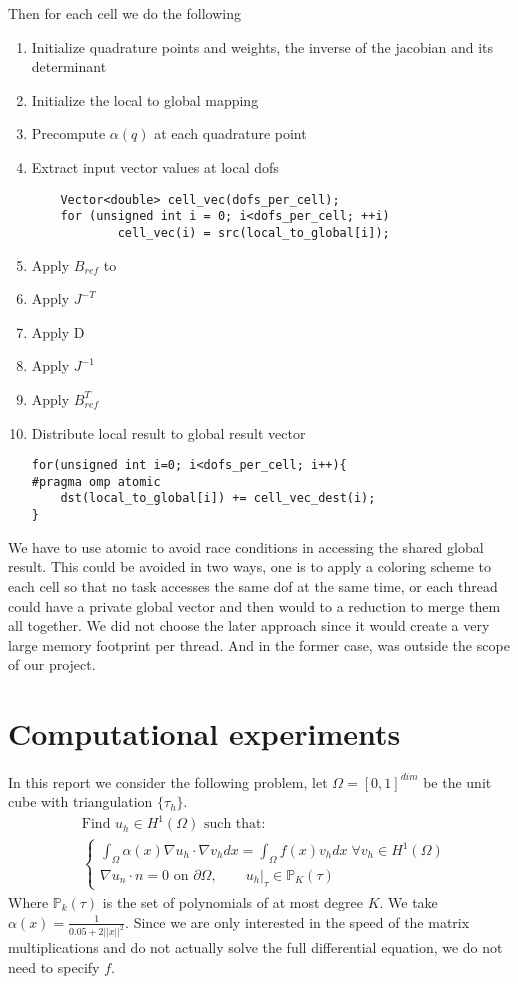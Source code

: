 \documentclass[12pt]{article}
\begin{document}
Then for each cell we do the following
\begin{enumerate}
\item Initialize quadrature points and weights, the inverse of the jacobian and its determinant
\item Initialize the local to global mapping
\item Precompute $\alpha(q)$ at each quadrature point
\item Extract input vector values at local dofs
\begin{lstlisting}
	Vector<double> cell_vec(dofs_per_cell);
	for (unsigned int i = 0; i<dofs_per_cell; ++i)
			cell_vec(i) = src(local_to_global[i]);
\end{lstlisting}
\item Apply $B_{ref}$ to 
\item Apply $J^{-T}$
\item Apply D
\item Apply $J^{-1}$
\item Apply $B^{T}_{ref}$
\item Distribute local result to global result vector
\begin{lstlisting}
for(unsigned int i=0; i<dofs_per_cell; i++){
#pragma omp atomic
	dst(local_to_global[i]) += cell_vec_dest(i);
}
\end{lstlisting}
\end{enumerate}
We have to use atomic to avoid race conditions in accessing the shared global result. This could be avoided in two ways, one is to apply a coloring scheme to each cell so that no task accesses the same dof at the same time, or each thread could have a private global vector and then would to a reduction to merge them all together. We did not choose the later approach since it would create a very large memory footprint per thread. And in the former case, was outside the scope of our project.


\section{Computational experiments}
In this report we consider the following problem, let $\Omega = [0, 1]^{dim}$ be the unit cube with triangulation $\{\tau_{h}\}$.
\begin{align*}
&\text{Find } u_{h} \in H^{1}(\Omega) \text{ such that: }  \\
&\begin{cases}
\int_{\Omega} \alpha(x) \nabla u_{h} \cdot \nabla v_{h} dx  = \int_{\Omega} f(x) v_{h} dx \; \forall v_{h} \in H^{1}(\Omega) \\
\nabla u_{n} \cdot n = 0 \text{ on } \partial \Omega ,\qquad u_{h} \vert_{\tau} \in \mathbb{P}_{K}(\tau) 
\end{cases}
\end{align*}
Where $\mathbb{P}_{k}(\tau) $ is the set of polynomials of at most degree $K$. We take $\alpha(x) = \frac{1}{0.05 + 2\vert \vert x \vert \vert^{2}}$. Since we are only interested in the speed of the matrix multiplications and do not actually solve the full differential equation, we do not need to specify $f$.
\end{document}
